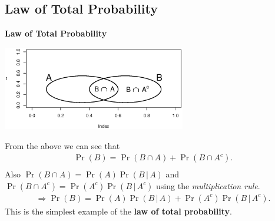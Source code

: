 \documentclass[compress]{beamer}        %
\makeatletter
\newcommand{\tcb}{\textcolor{beamer@blendedblue}}
\makeatother
\begin{document}
\subsection{Law of Total Probability}
\begin{frame}{\bf \tcb{Law of Total Probability}}

\begin{center}
\includegraphics[width=0.6\textwidth, trim = 3.5cm 3cm 2.5cm 4.3cm, clip]{totalprob}
\end{center}

From the above we can see that
\begin{align*}
\Pr(B) = \Pr(B \cap A) + \Pr(B \cap A^c).\\[-0.3cm]
\end{align*}
Also $\Pr(B \cap A) = \Pr(A) \Pr(B \,|\, A)$ and $\Pr(B \cap A^c) = \Pr(A^c) \Pr(B \,|\, A^c)$
using the \emph{multiplication rule}.\\[-0.2cm]

\begin{align*}
\Rightarrow \boxed{\Pr(B) = \Pr(A) \Pr(B \,|\, A) + \Pr(A^c) \Pr(B \,|\, A^c)}.
\end{align*}
This is the simplest example of the {\bf law of total probability}.

\end{frame}
\end{document}
